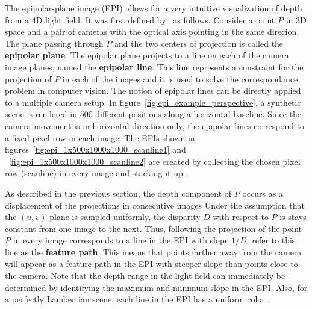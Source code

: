 The epipolar-plane image (EPI) allows for a very intuitive visualization of depth from a 4D light field.
It was first defined by~\cite{EPI} as follows.
Consider a point $P$ in 3D space and a pair of cameras with the optical axis pointing in the same direcion.
The plane passing through $P$ and the two centers of projection is called the \textbf{epipolar plane}.
The epipolar plane projects to a line on each of the camera image planes, named the \textbf{epipolar line}.
This line represents a constraint for the projection of $P$ in each of the images and it is used to solve the correspondance problem in computer vision.
The notion of epipolar lines can be directly applied to a multiple camera setup.
In figure~\ref{fig:epi_example_perspective}, a synthetic scene is rendered in 500 different positions along a horizontal baseline.
Since the camera movement is in horizontal direction only, the epipolar lines correspond to a fixed pixel row in each image.
The EPIs shown in figures~\ref{fig:epi_1x500x1000x1000_scanline1} and ~\ref{fig:epi_1x500x1000x1000_scanline2} are created by collecting the chosen pixel row (scanline) in every image and stacking it up.

As described in the previous section, the depth component of $P$ occurs as a displacement of the projections in consecutive images 
Under the assumption that the $(u, v)$-plane is sampled uniformly, the disparity $D$ with respect to $P$ is stays constant from one image to the next.
Thus, following the projection of the point $P$ in every image corresponds to a line in the EPI with slope $1 / D$.
\cite{EPI} refer to this line as the \textbf{feature path}.
This means that points farther away from the camera will appear as a feature path in the EPI with steeper slope than points close to the camera.
Note that the depth range in the light field can immediately be determined by identifying the maximum and minimum slope in the EPI.
Also, for a perfectly Lambertian scene, each line in the EPI has a uniform color.


